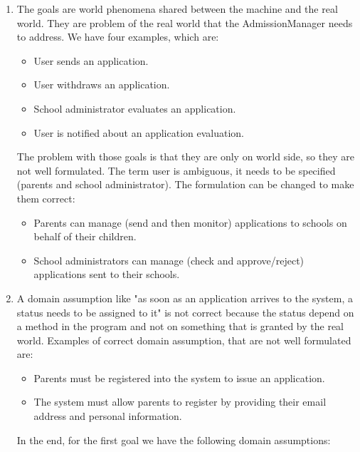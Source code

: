 \documentclass[12pt, a4paper]{report}
\newtheorem[style=M,bodystyle=\normalfont]{theorem}{Theorem}
\newtheorem[style=M,bodystyle=\normalfont]{corollary}{Corollary}
\newtheorem[style=M,bodystyle=\normalfont]{lemma}{Lemma}
\newtheorem[style=M,bodystyle=\normalfont]{definition}{Definition}
\begin{document}
    \begin{Answer}[ref=1]
        \begin{enumerate}
            \item The goals are world phenomena shared between the machine and the real world. They are problem of the real world that the AdmissionManager needs to address. We have 
                four examples, which are: 
                \begin{itemize}
                    \item User sends an application.
                    \item User withdraws an application.
                    \item School administrator evaluates an application.
                    \item User is notified about an application evaluation. 
                \end{itemize}
                The problem with those goals is that they are only on world side, so they are not well formulated. The term user is ambiguous, it needs to be specified (parents and school 
                administrator). The formulation can be changed to make them correct: 
                \begin{itemize}
                    \item Parents can manage (send and then monitor) applications to schools on behalf of their children.
                    \item School administrators can manage (check and approve/reject) applications sent to their schools.
                \end{itemize}
            \item A domain assumption like "as soon as an application arrives to the system, a status needs to be assigned to it" is not correct because the status depend on a method in 
                the program and not on something that is granted by the real world. Examples of correct domain assumption, that are not well formulated are: 
                \begin{itemize}
                    \item Parents must be registered into the system to issue an application. 
                    \item The system must allow parents to register by providing their email address and personal information.  
                \end{itemize}
                In the end, for the first goal we have the following domain assumptions: 

\end{enumerate}
\end{Answer}
\end{document}
